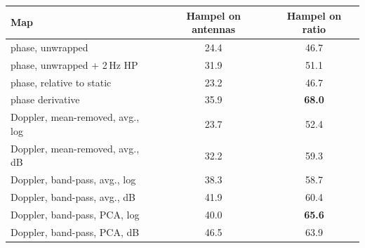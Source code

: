 \begin{tabular}{@{}lcc@{}}
\toprule
Map & Hampel on antennas & Hampel on ratio \\
\midrule
phase, unwrapped & 24.4 & 46.7 \\
phase, unwrapped + 2\,Hz HP & 31.9 & 51.1 \\
phase, relative to static & 23.2 & 46.7 \\
phase derivative & 35.9 & \textbf{68.0} \\
Doppler, mean-removed, avg., log & 23.7 & 52.4 \\
Doppler, mean-removed, avg., dB & 32.2 & 59.3 \\
Doppler, band-pass, avg., log & 38.3 & 58.7 \\
Doppler, band-pass, avg., dB & 41.9 & 60.4 \\
Doppler, band-pass, PCA, log & 40.0 & \textbf{65.6} \\
Doppler, band-pass, PCA, dB & 46.5 & 63.9 \\
\bottomrule
\end{tabular}
